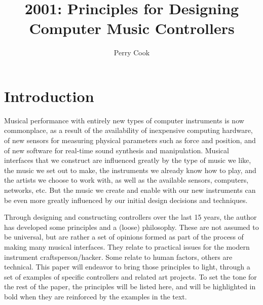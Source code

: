 
\graphicspath{ {mainmatter/Cook_2001/} }

\title*{2001: Principles for Designing Computer Music Controllers}

\author{Perry Cook}


%
%
\maketitle



\section{Introduction}

Musical performance with entirely new types of computer instruments is now
commonplace, as a result of the availability of inexpensive computing hardware,
of new sensors for measuring physical parameters such as force and position, and
of new software for real-time sound synthesis and manipulation. Musical
interfaces that we construct are influenced greatly by the type of music we like,
the music we set out to make, the instruments we already know how to play, and
the artists we choose to work with, as well as the available sensors, computers,
networks, etc.  But the music we create and enable with our new instruments can
be even more greatly influenced by our initial design decisions and techniques.

Through designing and constructing controllers over the last 15 years, the
author has developed some principles and a (loose) philosophy.  These are not
assumed to be universal, but are rather a set of opinions formed as part of the
process of making many musical interfaces.  They relate to practical issues for
the modern instrument craftsperson/hacker.  Some relate to human factors, others
are technical.  This paper will endeavor to bring those principles to light,
through a set of examples of specific controllers and related art projects.  To
set the tone for the rest of the paper, the principles will be listed here, and
will be highlighted in bold when they are reinforced by the examples in the text.

